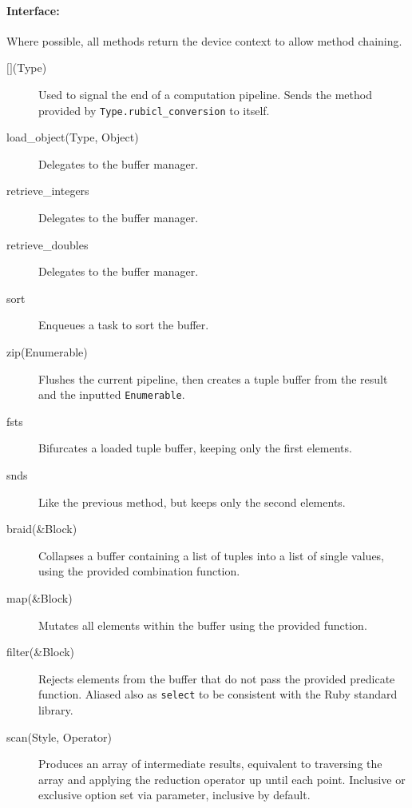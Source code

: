 \begin{description}
\paragraph*{Interface:}
Where possible, all methods return the device context to allow method chaining.
\begin{description}
  \item[$\lbrack\rbrack$(Type)] Used to signal the end of a computation pipeline. Sends the method provided by \verb|Type.rubicl_conversion| to itself.

  \item[load\_object(Type, Object)] Delegates to the buffer manager.

  \item[retrieve\_integers] Delegates to the buffer manager.

  \item[retrieve\_doubles] Delegates to the buffer manager.

  \item[sort] Enqueues a task to sort the buffer.

  \item[zip(Enumerable)] Flushes the current pipeline, then creates a tuple buffer from the result and the inputted \verb|Enumerable|.

  \item[fsts] Bifurcates a loaded tuple buffer, keeping only the first elements.

  \item[snds] Like the previous method, but keeps only the second elements.

  \item[braid(\&Block)] Collapses a buffer containing a list of tuples into a list of single values, using the provided combination function.

  \item[map(\&Block)] Mutates all elements within the buffer using the provided function.

  \item[filter(\&Block)] Rejects elements from the buffer that do not pass the provided predicate function. Aliased also as \verb|select| to be consistent with the Ruby standard library.

  \item[scan(Style, Operator)] Produces an array of intermediate results, equivalent to traversing the array and applying the reduction operator up until each point. Inclusive or exclusive option set via parameter, inclusive by default.



\end{description}
\end{description}
